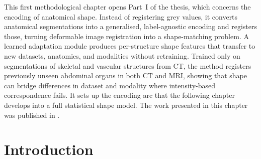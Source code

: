 This first methodological chapter opens Part~I of the thesis, which concerns the encoding
of anatomical shape. Instead of registering grey values, it converts anatomical
segmentations into a generalised, label-agnostic encoding and registers those, turning
deformable image registration into a shape-matching problem. A learned adaptation module
produces per-structure shape features that transfer to new datasets, anatomies, and
modalities without retraining. Trained only on segmentations of skeletal and vascular
structures from CT, the method registers previously unseen abdominal organs in both CT and
MRI, showing that shape can bridge differences in dataset and modality where
intensity-based correspondence fails. It sets up the encoding arc that the following
chapter develops into a full statistical shape model. The work presented in this chapter
was published in \citep{grossbrohmer2023generalised}.


\section{Introduction}


